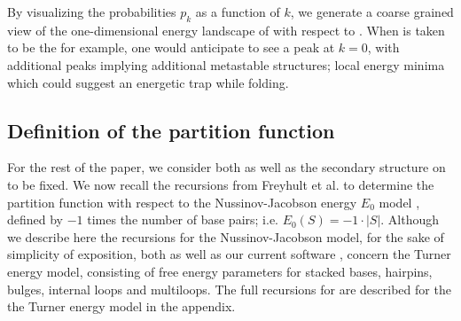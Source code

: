 By visualizing the probabilities $p_k$ as a function of $k$, we generate a
coarse grained view of the one-dimensional energy landscape of \seq with
respect to \strSt. When \strSt is taken to be the \mfes for example, one would
anticipate to see a peak at $k=0$, with additional peaks implying additional
metastable structures; local energy minima which could suggest an energetic
trap while folding.

\subsection{Definition of the partition function
\texorpdfstring{}{}}
\label{subsec:fftbor:recursions}

For the rest of the paper, we consider both \seq as well as the
secondary structure \strSt on \seq to be fixed. We now recall the
recursions from Freyhult et al. \cite{Freyhult.ab05} to determine
the partition function  with
respect to the Nussinov-Jacobson
energy $E_0$ model \cite{nussinovJacobson}, defined by
$-1$ times the number of base pairs; i.e. $E_0(S) = -1 \cdot |S|$.
Although we describe here the recursions for the Nussinov-Jacobson
model, for the sake of
simplicity of exposition, both \rnabor
\cite{Freyhult.ab05} as well as our current software \fftbor,
concern the Turner energy model, consisting of free energy parameters for
stacked bases, hairpins, bulges, internal loops and multiloops. The full
recursions for \fftbor are described for the
the Turner energy model in the appendix.

